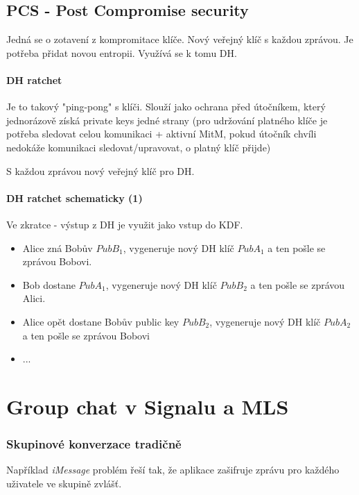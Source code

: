 \documentclass[10pt,a4paper]{article}
\begin{document}
\subsection{PCS - Post Compromise security}
Jedná se o zotavení z kompromitace klíče. Nový veřejný klíč s každou zprávou.
Je potřeba přidat novou entropii. Využívá se k tomu DH. 

\paragraph{DH ratchet}
Je to takový "ping-pong" s klíči.
Slouží jako ochrana před útočníkem, který jednorázově získá private keys jedné strany (pro udržování platného klíče je potřeba
sledovat celou komunikaci + aktivní MitM, pokud útočník chvíli nedokáže komunikaci sledovat/upravovat, o platný klíč přijde)

S každou zprávou nový veřejný klíč pro DH.


\paragraph{DH ratchet schematicky (1)}
Ve zkratce - výstup z DH je využit jako vstup do KDF.

\begin{itemize}\setlength\itemsep{0em}
	\item Alice zná Bobův $PubB_1$, vygeneruje nový DH klíč $PubA_1$ a ten pošle se zprávou Bobovi.
	\item Bob dostane $PubA_1$, vygeneruje nový DH klíč $ PubB_2 $ a ten pošle se zprávou Alici.
	\item Alice opět dostane Bobův public key $ PubB_2 $, vygeneruje nový DH klíč $ PubA_2 $ a ten pošle se zprávou Bobovi
	\item ...
\end{itemize}



\section{Group chat v Signalu a MLS}

\subsubsection*{Skupinové konverzace tradičně}
Například \textit{iMessage} problém řeší tak, že aplikace zašifruje zprávu pro každého uživatele ve skupině zvlášť.
\end{document}
